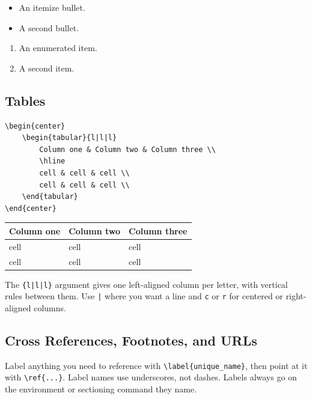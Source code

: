 \begin{itemize}
	\item An itemize bullet.
	\item A second bullet.
\end{itemize}

\begin{enumerate}
	\item An enumerated item.
	\item A second item.
\end{enumerate}

\subsection{Tables}

\begin{lstlisting}[style=latexstyle]
\begin{center}
	\begin{tabular}{l|l|l}
		Column one & Column two & Column three \\
		\hline
		cell & cell & cell \\
		cell & cell & cell \\
	\end{tabular}
\end{center}
\end{lstlisting}

\begin{center}
	\begin{tabular}{l|l|l}
		Column one & Column two & Column three \\
		\hline
		cell & cell & cell \\
		cell & cell & cell \\
	\end{tabular}
\end{center}

The \texttt{\{l|l|l\}} argument gives one left-aligned column per letter, with vertical rules between them. Use \texttt{|} where you want a line and \texttt{c} or \texttt{r} for centered or right-aligned columns.

\subsection{Cross References, Footnotes, and URLs}

Label anything you need to reference with \lstinline|\label{unique_name}|, then point at it with \lstinline|\ref{...}|. Label names use underscores, not dashes. Labels always go on the environment or sectioning command they name.

